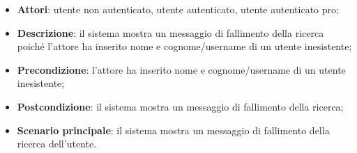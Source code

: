 \begin{itemize}
	\item \textbf{Attori}: utente non autenticato, utente autenticato, utente autenticato pro;
	\item \textbf{Descrizione}: il sistema mostra un messaggio di fallimento della ricerca poiché l'attore ha inserito nome e cognome/username di un utente inesistente;
	\item \textbf{Precondizione}: l'attore ha inserito nome e cognome/username di un utente inesistente;
	\item \textbf{Postcondizione}: il sistema mostra un messaggio di fallimento della ricerca;
	\item \textbf{Scenario principale}: il sistema mostra un messaggio di fallimento della ricerca dell'utente.
\end{itemize}